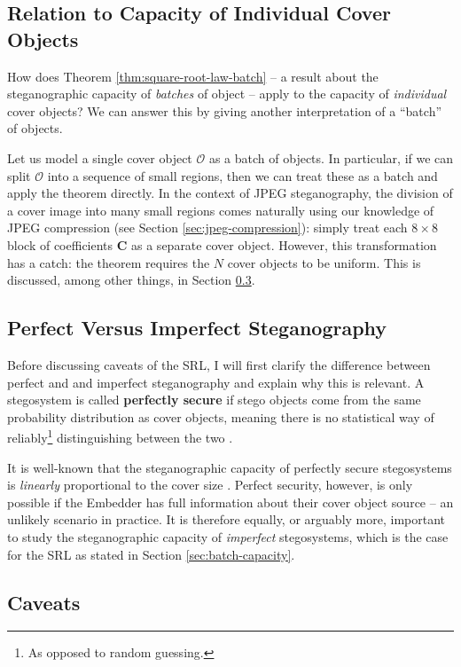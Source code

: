 \documentclass[11pt,a4paper,twoside,openright]{report}
\begin{document}
\subsection{Relation to Capacity of Individual Cover Objects}

How does Theorem \ref{thm:square-root-law-batch} -- a result about the steganographic capacity of \textit{batches} of object -- apply to the capacity of \textit{individual} cover objects? We can answer this by giving another interpretation of a ``batch'' of objects.

Let us model a single cover object $\mathcal{O}$ as a batch of objects. In particular, if we can split $\mathcal{O}$ into a sequence of small regions, then we can treat these as a batch and apply the theorem directly. In the context of JPEG steganography, the division of a cover image into many small regions comes naturally using our knowledge of JPEG compression (see Section \ref{sec:jpeg-compression}): simply treat each $8\times8$ block of coefficients $\bm{C}$ as a separate cover object. However, this transformation has a catch: the theorem requires the $N$ cover objects to be uniform. This is discussed, among other things, in Section \ref{sec:srl-caveats}.


\subsection{Perfect Versus Imperfect Steganography}

Before discussing caveats of the SRL, I will first clarify the difference between perfect and and imperfect steganography and explain why this is relevant. A stegosystem is called \textbf{perfectly secure} if stego objects come from the same probability distribution as cover objects, meaning there is no statistical way of reliably\footnote{As opposed to random guessing.} distinguishing between the two \cite{perfect-steganography}.

It is well-known that the steganographic capacity of perfectly secure stegosystems is \textit{linearly} proportional to the cover size \cite{srl-markov-covers}. Perfect security, however, is only possible if the Embedder has full information about their cover object source -- an unlikely scenario in practice. It is therefore equally, or arguably more, important to study the steganographic capacity of \textit{imperfect} stegosystems, which is the case for the SRL as stated in Section \ref{sec:batch-capacity}.


\subsection{Caveats} \label{sec:srl-caveats}
\end{document}
